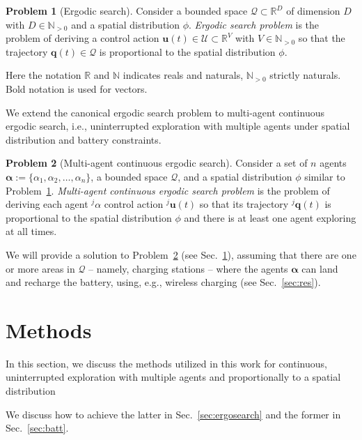 \documentclass[letterpaper,10pt,conference,twoside]{IEEEtran}
\theoremstyle{definition}
\newtheorem{pb}{Problem}[section]
\begin{document}
\begin{pb}[Ergodic search]\label{pb:ergo}
  Consider a bounded space $\mathcal{Q}\subset\mathbb{R}^D$ of dimension $D$ with $D\in\mathbb{N}_{>0}$ and a spatial distribution $\phi$. \textit{Ergodic search problem} is the problem of deriving a control action $\mathbf{u}(t)\in\mathcal{U}\subset\mathbb{R}^V$ with $V\in\mathbb{N}_{>0}$ so that the trajectory $\mathbf{q}(t)\in\mathcal{Q}$ is proportional to the spatial distribution $\phi$.
\end{pb}

Here the notation $\mathbb{R}$ and $\mathbb{N}$ indicates reals and naturals, $\mathbb{N}_{>0}$ strictly naturals. Bold notation is used for vectors.

We extend the canonical ergodic search problem to multi-agent continuous ergodic search, i.e., uninterrupted exploration with multiple agents under spatial distribution and battery constraints.

\begin{pb}[Multi-agent continuous ergodic search]\label{pb:enerergo}
  Consider a set of $n$ agents $\boldsymbol{\alpha}:=\{\alpha_1,\alpha_2,\dots,\alpha_n\}$, a bounded space $\mathcal{Q}$, and a spatial distribution $\phi$ similar to Problem~\ref{pb:ergo}. \textit{Multi-agent continuous ergodic search problem} is the problem of deriving each agent ${}^j\alpha$ control action ${}^j\mathbf{u}(t)$ so that its trajectory ${}^j\mathbf{q}(t)$ is proportional to the spatial distribution $\phi$ and there is at least one agent exploring at all times.
\end{pb}

We will provide a solution to Problem~\ref{pb:enerergo} (see Sec.~\ref{sec:meth}), assuming that there are one or more areas in $\mathcal{Q}$ -- namely, charging stations -- where the agents $\boldsymbol{\alpha}$ can land and recharge the battery, using, e.g., wireless charging (see Sec.~\ref{sec:res}). 


\section{Methods}\label{sec:meth}
\noindent
In this section, we discuss the methods utilized in this work for continuous, uninterrupted exploration with multiple agents and proportionally to a spatial distribution

We discuss how to achieve the latter in Sec.~\ref{sec:ergosearch} and the former in Sec.~\ref{sec:batt}.
\end{document}
